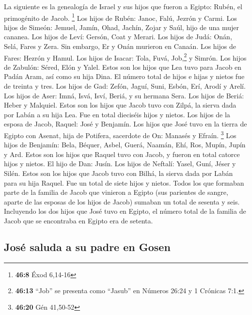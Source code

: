  La siguiente es la genealogía de Israel y sus hijos que
fueron a Egipto: Rubén, el primogénito de Jacob. \footnote{\textbf{46:8}
  Éxod 6,14-16}  Los hijos de Rubén: Janoc, Falú, Jezrón y
Carmi.  Los hijos de Simeón: Jemuel, Jamín, Ohad, Jachín,
Zojar y Saúl, hijo de una mujer cananea.  Los hijos de
Leví: Gersón, Coat y Merari.  Los hijos de Judá: Onán,
Selá, Fares y Zera. Sin embargo, Er y Onán murieron en Canaán. Los hijos
de Fares: Hezrón y Hamul.  Los hijos de Isacar: Tola,
Fuvá, Job,\footnote{\textbf{46:13} ``Job'' se presenta como ``Jasub'' en
  Números 26:24 y 1 Crónicas 7:1.} y Simrón.  Los hijos
de Zabulón: Séred, Elón y Yalel.  Estos son los hijos que
Lea tuvo para Jacob en Padán Aram, así como su hija Dina. El número
total de hijos e hijas y nietos fue de treinta y tres. 
Los hijos de Gad: Zefón, Jaguí, Suni, Esbón, Erí, Arodí y Arelí.
 Los hijos de Aser: Imná, Isvá, Isví, Beriá, y su hermana
Sera. Los hijos de Beriá: Heber y Malquiel.  Estos son
los hijos que Jacob tuvo con Zilpá, la sierva dada por Labán a su hija
Lea. Fue en total dieciséis hijos y nietos.  Los hijos de
la esposa de Jacob, Raquel: José y Benjamín.  Los hijos
que José tuvo en la tierra de Egipto con Asenat, hija de Potifera,
sacerdote de On: Manasés y Efraín. \footnote{\textbf{46:20} Gén 41,50-52}
 Los hijos de Benjamín: Bela, Béquer, Asbel, Guerá,
Naamán, Ehí, Ros, Mupín, Jupín y Ard.  Estos son los
hijos que Raquel tuvo con Jacob, y fueron en total catorce hijos y
nietos.  El hijo de Dan: Jusín.  Los hijos
de Neftalí: Yasel, Guní, Jéser y Silén.  Estos son los
hijos que Jacob tuvo con Bilhá, la sierva dada por Labán para su hija
Raquel. Fue un total de siete hijos y nietos.  Todos los
que formaban parte de la familia de Jacob que vinieron a Egipto (sus
parientes de sangre, aparte de las esposas de los hijos de Jacob)
sumaban un total de sesenta y seis.  Incluyendo los dos
hijos que José tuvo en Egipto, el número total de la familia de Jacob
que se encontraba en Egipto era de setenta.

\hypertarget{josuxe9-saluda-a-su-padre-en-gosen}{%
\subsection{José saluda a su padre en
Gosen}\label{josuxe9-saluda-a-su-padre-en-gosen}}

